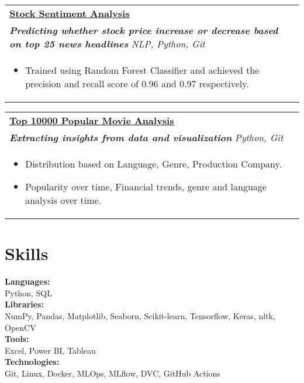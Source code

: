 \documentclass[a4paper,8pt]{article}
\begin{document}
\begin{tabularx}{\linewidth}{ @{}l r@{} }
\color[HTML]{1C033C} \textbf{\uline{\href{https://github.com/vikaschauhan734/stock_sentiment_analysis}{Stock Sentiment Analysis}}}\\[4pt]
\color[HTML]{371e77}\textbf{\textit{Predicting whether stock price increase or decrease based on top 25 news headlines}} \hfill \color[HTML]{4B28A4} \textit{NLP, Python, Git} \\[5pt]
\begin{minipage}[t]{\linewidth}
    \begin{itemize}[nosep,after=\strut, leftmargin=2em, itemsep=2pt]
        \item Trained using Random Forest Classifier and achieved the precision and recall score of 0.96 and 0.97 respectively.
    \end{itemize}
    \end{minipage}
\end{tabularx}

\begin{tabularx}{\linewidth}{ @{}l r@{} }
\color[HTML]{1C033C} \textbf{\uline{\href{https://github.com/vikaschauhan734/top_10000_popular_movies_analysis}{Top 10000 Popular Movie Analysis}}}\\[4pt]
\color[HTML]{371e77}\textbf{\textit{Extracting insights from data and visualization}} \hfill \color[HTML]{4B28A4} \textit{Python, Git} \\[5pt]
\begin{minipage}[t]{\linewidth}
    \begin{itemize}[nosep,after=\strut, leftmargin=2em, itemsep=2pt]
        \item Distribution based on Language, Genre, Production Company.
	\item Popularity over time, Financial trends, genre and language analysis over time.
    \end{itemize}
    \end{minipage}
\end{tabularx}

\section{Skills}
\color[HTML]{1C033C}\textbf{Languages:} \\[2pt]
\color[HTML]{371e77} \hspace*{4ex} Python, SQL\\[3pt]
\color[HTML]{1C033C}\textbf{Libraries:} \\[2pt]
\color[HTML]{371e77} \hspace*{4ex} NumPy, Pandas, Matplotlib, Seaborn, Scikit-learn, Tensorflow, Keras, nltk, OpenCV\\[3pt]
\color[HTML]{1C033C}\textbf{Tools:} \\[2pt]
\color[HTML]{371e77} \hspace*{4ex} Excel, Power BI, Tableau\\[3pt]
\color[HTML]{1C033C}\textbf{Technologies:} \\[2pt]
\color[HTML]{371e77} \hspace*{4ex} Git, Linux, Docker, MLOps, MLflow, DVC, GitHub Actions\\[3pt]
\end{document}
